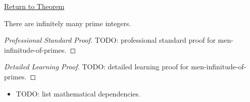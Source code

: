 \newpage
{}
\label{prf:men-infinitude-of-primes}

\begin{remark*}[Return]
\hyperref[thm:men-infinitude-of-primes]{Return to Theorem}
\end{remark*}

\begin{theorem*}
There are infinitely many prime integers.
\end{theorem*}

\begin{proof}[Professional Standard Proof]
\LRAProofBodyStart
TODO: professional standard proof for men-infinitude-of-primes.
\end{proof}

\begin{proof}[Detailed Learning Proof]
\LRAProofBodyStart
TODO: detailed learning proof for men-infinitude-of-primes.
\end{proof}

\begin{remark*}
\end{remark*}

\begin{dependencies}
\begin{itemize}
  \item TODO: list mathematical dependencies.
\end{itemize}
\end{dependencies}

\clearpage
